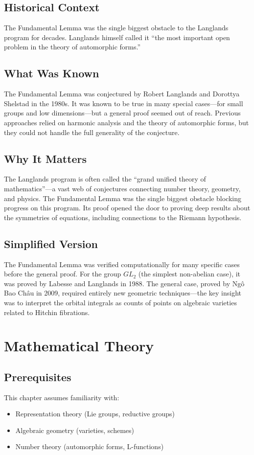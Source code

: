\subsection{Historical Context}
The Fundamental Lemma was the single biggest obstacle to the Langlands program for decades. Langlands himself called it ``the most important open problem in the theory of automorphic forms.''

\subsection{What Was Known}
The Fundamental Lemma was conjectured by Robert Langlands and Dorottya Shelstad in the 1980s. It was known to be true in many special cases---for small groups and low dimensions---but a general proof seemed out of reach. Previous approaches relied on harmonic analysis and the theory of automorphic forms, but they could not handle the full generality of the conjecture.

\subsection{Why It Matters}
The Langlands program is often called the ``grand unified theory of mathematics''---a vast web of conjectures connecting number theory, geometry, and physics. The Fundamental Lemma was the single biggest obstacle blocking progress on this program. Its proof opened the door to proving deep results about the symmetries of equations, including connections to the Riemann hypothesis.

\subsection{Simplified Version}
The Fundamental Lemma was verified computationally for many specific cases before the general proof. For the group $GL_2$ (the simplest non-abelian case), it was proved by Labesse and Langlands in 1988. The general case, proved by Ngô Bao Châu in 2009, required entirely new geometric techniques---the key insight was to interpret the orbital integrals as counts of points on algebraic varieties related to Hitchin fibrations.

\section{Mathematical Theory}


\subsection{Prerequisites}
This chapter assumes familiarity with:
\begin{itemize}
\item Representation theory (Lie groups, reductive groups)
\item Algebraic geometry (varieties, schemes)
\item Number theory (automorphic forms, L-functions)
\end{itemize}

